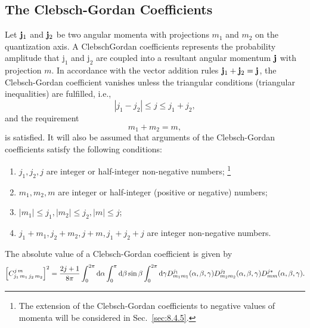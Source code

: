 \subsection{The Clebsch-Gordan Coefficients}\label{sec:8.1.1}
Let $\mathbf{j}_{1}$ and $\mathbf{j}_{2}$ be two angular momenta with projections $m_{1}$ and $m_{2}$ on the quantization axis. A ClebschGordan coefficients represents the probability amplitude that $\mathrm{j}_{1}$ and $\mathrm{j}_{2}$ are coupled into a resultant angular momentum $\mathbf{j}$ with projection $m$. In accordance with the vector addition rules $\mathbf{j}_{1}+\mathbf{j}_{2}=\mathbf{j}$, the Clebsch-Gordan coefficient vanishes unless the triangular conditions (triangular inequalities) are fulfilled, i.e.,
\begin{equation}
\left|j_{1}-j_{2}\right| \leq j \leq j_{1}+j_{2}, \label{eq:8:1:1}
\end{equation}
and the requirement
\begin{equation}
m_{1}+m_{2}=m, \label{eq:8:1:2}
\end{equation}
is satisfied. It will also be assumed that arguments of the Clebsch-Gordan coefficients satisfy the following conditions:
\begin{enumerate}[label=(\alph*)]
\item $j_{1}, j_{2}, j$ are integer or half-integer non-negative numbers; \footnote{The extension of the Clebsch-Gordan coefficients to negative values of momenta will be considered in Sec.~\ref{sec:8.4.5}.
}
\item $m_{1}, m_{2}, m$ are integer or half-integer (positive or negative) numbers;
\item $\left|m_{1}\right| \leq j_{1},\left|m_{2}\right| \leq j_{2},|m| \leq j$;
\item $j_{1}+m_{1}, j_{2}+m_{2}, j+m, j_{1}+j_{2}+j$ are integer non-negative numbers.
\end{enumerate}
\label{eq:8:1:3}
The absolute value of a Clebsch-Gordan coefficient is given by
\begin{equation}
\left[C_{j_{1}\,m_{1}\,j_{2}\,m_{2}}^{j\,m}\right]^{2}=\frac{2 j+1}{8 \pi} \int_{0}^{2 \pi}\mathrm{d} \alpha \int_{0}^{\pi}\mathrm{d} \beta \sin \beta \int_{0}^{2 \pi}\mathrm{d} \gamma D_{m_{1} m_{1}}^{j_{1}}(\alpha, \beta, \gamma) D_{m_{2} m_{2}}^{j_{2}}(\alpha, \beta, \gamma) D_{m m}^{j *}(\alpha, \beta, \gamma). \label{eq:8:1:4}
\end{equation}
